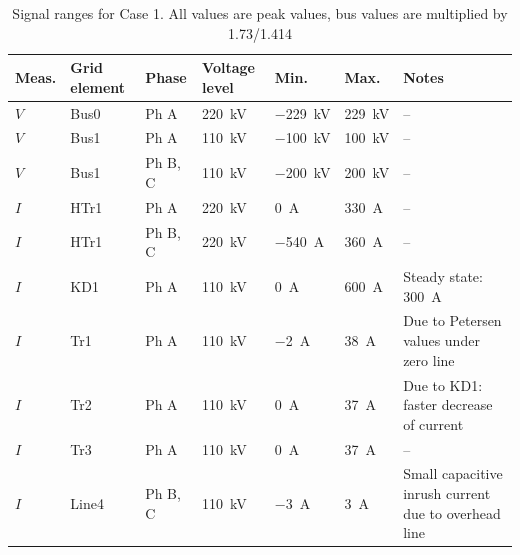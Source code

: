
\begin{table}[htbp]
  \centering
  \caption{Signal ranges for Case 1. All values are peak values, bus values are multiplied by 1.73/1.414}
  \label{tab:measurement-values-case1}
  \small
  \setlength{\tabcolsep}{3.5pt}
  \renewcommand{\arraystretch}{1.18}
  \begin{tabularx}{\textwidth}{@{}
      >{\raggedright\arraybackslash}p{}
      >{\raggedright\arraybackslash}p{}
      >{\raggedright\arraybackslash}p{}
      >{\raggedright\arraybackslash}p{}
      >{\raggedright\arraybackslash}p{}
      >{\raggedright\arraybackslash}p{}
      Y@{}}
    \toprule
    \textbf{Meas.} &
    \textbf{Grid element} &
    \textbf{Phase} &
    \textbf{Voltage level} &
    \textbf{Min.} &
    \textbf{Max.} &
    \textbf{Notes} \\
    \midrule
    $V$ & Bus0  & Ph A       & \SI{220}{\kilo\volt} & \SI{-229}{\kilo\volt} & \SI{229}{\kilo\volt} & -- \\
    $V$ & Bus1  & Ph A & \SI{110}{\kilo\volt} & \SI{-100}{\kilo\volt} & \SI{100}{\kilo\volt} & -- \\
     $V$ & Bus1  & Ph B, C & \SI{110}{\kilo\volt} & \SI{-200}{\kilo\volt} & \SI{200}{\kilo\volt} & -- \\
    $I$ & HTr1  & Ph A       & \SI{220}{\kilo\volt} & \SI{0}{\ampere} & \SI{330}{\ampere} & -- \\
    $I$ & HTr1  & Ph B, C    & \SI{220}{\kilo\volt} & \SI{-540}{\ampere} & \SI{360}{\ampere} & -- \\
    $I$ & KD1   & Ph A       & \SI{110}{\kilo\volt} & \SI{0}{\ampere} & \SI{600}{\ampere} & Steady state: \SI{300}{\ampere} \\
    $I$ & Tr1   & Ph A       & \SI{110}{\kilo\volt} & \SI{-2}{\ampere} & \SI{38}{\ampere} & Due to Petersen values under zero line \\
    $I$ & Tr2   & Ph A       & \SI{110}{\kilo\volt} & \SI{0}{\ampere} & \SI{37}{\ampere} & Due to KD1: faster decrease of current \\
    $I$ & Tr3   & Ph A       & \SI{110}{\kilo\volt} & \SI{0}{\ampere} & \SI{37}{\ampere} & -- \\
    $I$ & Line4 & Ph B, C & \SI{110}{\kilo\volt} & \SI{-3}{\ampere} & \SI{3}{\ampere} & Small capacitive inrush current due to overhead line \\

\end{tabularx}
\end{table}
